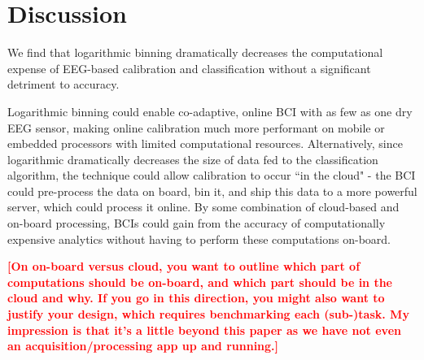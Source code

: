 \section{Discussion}

We find that logarithmic binning dramatically decreases the computational expense of EEG-based calibration and classification without a significant detriment to accuracy. 

Logarithmic binning could enable co-adaptive, online BCI with as few as one dry EEG sensor, making online calibration much more performant on mobile or embedded processors with limited computational resources. Alternatively, since logarithmic dramatically decreases the size of data fed to the classification algorithm, the technique could allow calibration to occur ``in the cloud" - the BCI could pre-process the data on board, bin it, and ship this data to a more powerful server, which could process it online. By some combination of cloud-based and on-board processing, BCIs could gain from the accuracy of computationally expensive analytics without having to perform these computations on-board.

\textcolor{red}{\bf [On on-board versus cloud, you want to outline which part of computations should be on-board, and which part should be in the cloud and why. If you go in this direction, you might also want to justify your design, which requires benchmarking each (sub-)task. My impression is that it's a little beyond this paper as we have not even an acquisition/processing app up and running.]}

